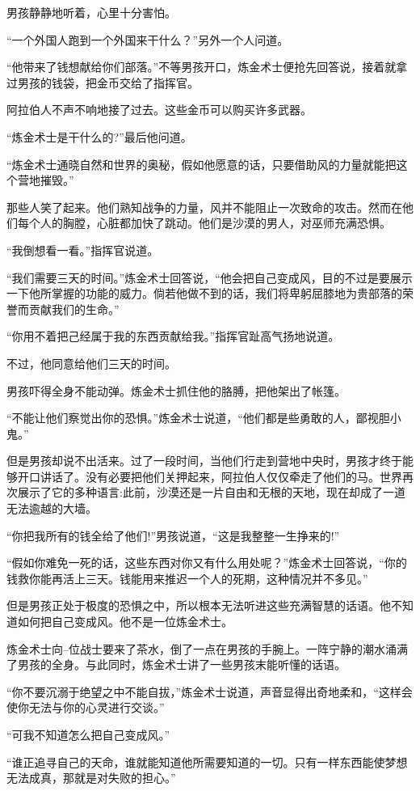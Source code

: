 \documentclass[twoside,openany]{book}
\begin{document}
男孩静静地听着，心里十分害怕。

“一个外国人跑到一个外国来干什么？”另外一个人问道。

“他带来了钱想献给你们部落。”不等男孩开口，炼金术士便抢先回答说，接着就拿过男孩的钱袋，把金币交给了指挥官。

阿拉伯人不声不响地接了过去。这些金币可以购买许多武器。

“炼金术士是干什么的?”最后他问道。

“炼金术士通晓自然和世界的奥秘，假如他愿意的话，只要借助风的力量就能把这个营地摧毁。”

那些人笑了起来。他们熟知战争的力量，风并不能阻止一次致命的攻击。然而在他们每个人的胸膛，心脏都加快了跳动。他们是沙漠的男人，对巫师充满恐惧。

“我倒想看一看。”指挥官说道。

“我们需要三天的时间。”炼金术士回答说，“他会把自己变成风，目的不过是要展示一下他所掌握的功能的威力。倘若他做不到的话，我们将卑躬屈膝地为贵部落的荣誉而贡献我们的生命。”

“你用不着把己经属于我的东西贡献给我。”指挥官趾高气扬地说道。

不过，他同意给他们三天的时间。

男孩吓得全身不能动弹。炼金术士抓住他的胳膊，把他架出了帐篷。

“不能让他们察觉出你的恐惧。”炼金术士说道，“他们都是些勇敢的人，鄙视胆小鬼。”

但是男孩却说不出活来。过了一段时间，当他们行走到营地中央时，男孩才终于能够开口讲话了。没有必要把他们关押起来，阿拉伯人仅仅牵走了他们的马。世界再次展示了它的多种语言:此前，沙漠还是一片自由和无根的天地，现在却成了一道无法逾越的大墙。

“你把我所有的钱全给了他们!”男孩说道，“这是我整整一生挣来的!”

“假如你难免一死的话，这些东西对你又有什么用处呢？”炼金术士回答说，“你的钱救你能再活上三天。钱能用来推迟一个人的死期，这种情况并不多见。”

但是男孩正处于极度的恐惧之中，所以根本无法听进这些充满智慧的话语。他不知道如何把自己变成风。他不是一位炼金术士。

炼金术士向--位战士要来了茶水，倒了一点在男孩的手腕上。一阵宁静的潮水涌满了男孩的全身。与此同时，炼金术士讲了一些男孩末能听懂的话语。

“你不要沉溺于绝望之中不能自拔，”炼金术士说道，声音显得出奇地柔和，“这样会使你无法与你的心灵进行交谈。”

“可我不知道怎么把自己变成风。”

“谁正追寻自己的天命，谁就能知道他所需要知道的一切。只有一样东西能使梦想无法成真，那就是对失败的担心。”
\end{document}
